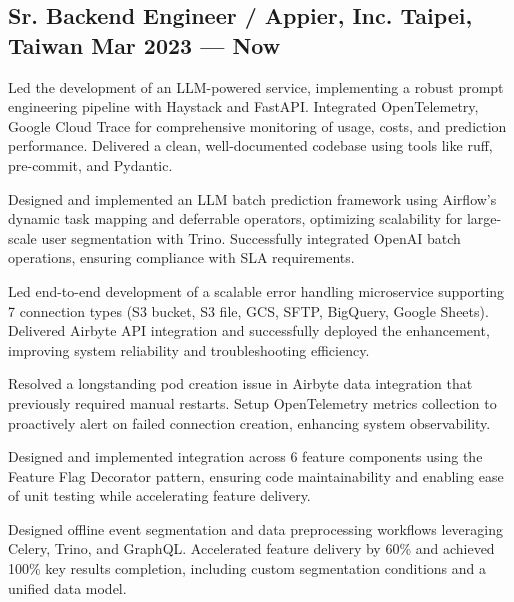 \subsection{{Sr. Backend Engineer / Appier, Inc. \hfill Taipei, Taiwan \> Mar 2023 --- Now}}
\begin{zitemize}
\item Led the development of an LLM-powered service, implementing a robust prompt engineering pipeline with Haystack and FastAPI. Integrated OpenTelemetry, Google Cloud Trace for comprehensive monitoring of usage, costs, and prediction performance. Delivered a clean, well-documented codebase using tools like ruff, pre-commit, and Pydantic.
\item Designed and implemented an LLM batch prediction framework using Airflow's dynamic task mapping and deferrable operators, optimizing scalability for large-scale user segmentation with Trino. Successfully integrated OpenAI batch operations, ensuring compliance with SLA requirements.
\end{zitemize}

\begin{zitemize}
\item Led end-to-end development of a scalable error handling microservice supporting 7 connection types (S3 bucket, S3 file, GCS, SFTP, BigQuery, Google Sheets). Delivered Airbyte API integration and successfully deployed the enhancement, improving system reliability and troubleshooting efficiency.
\item Resolved a longstanding pod creation issue in Airbyte data integration that previously required manual restarts. Setup OpenTelemetry metrics collection to proactively alert on failed connection creation, enhancing system observability.
\end{zitemize}

\begin{zitemize}
\item Designed and implemented integration across 6 feature components using the Feature Flag Decorator pattern, ensuring code maintainability and enabling ease of unit testing while accelerating feature delivery.
\item Designed offline event segmentation and data preprocessing workflows leveraging Celery, Trino, and GraphQL. Accelerated feature delivery by 60\% and achieved 100\% key results completion, including custom segmentation conditions and a unified data model.
\end{zitemize}

